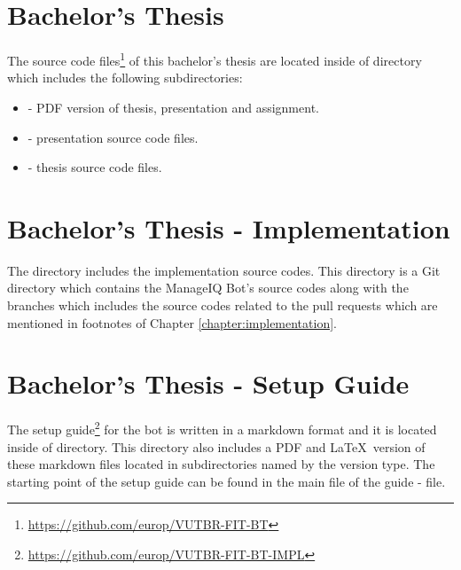 \section{Bachelor's Thesis}\label{section:BT}

The source code files\footnote{\url{https://github.com/europ/VUTBR-FIT-BT}} of this bachelor's thesis are located inside of  directory which includes the following subdirectories:

\begin{itemize}

    \item {} - PDF version of thesis, presentation and assignment.
    \item {} - presentation source code files.
    \item {} - thesis source code files.

\end{itemize}

\section{Bachelor's Thesis - Implementation}\label{section:BT-I}

The  directory includes the implementation source codes. This directory is a Git directory which contains the ManageIQ Bot's source codes along with the branches which includes the source codes related to the pull requests which are mentioned in footnotes of Chapter \ref{chapter:implementation}.

\section{Bachelor's Thesis - Setup Guide}\label{section:BT-SG}

The setup guide\footnote{\url{https://github.com/europ/VUTBR-FIT-BT-IMPL}} for the bot is written in a markdown format and it is located inside of  directory. This directory also includes a PDF and \LaTeX\ version of these markdown files located in subdirectories named by the version type. The starting point of the setup guide can be found in the main file of the guide -  file.
